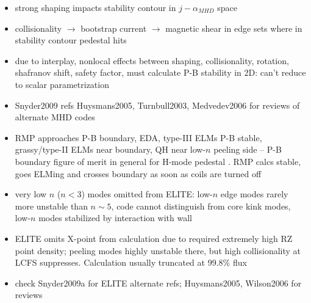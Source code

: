 \begin{itemize}
 \item strong shaping impacts stability contour in $j-\alpha_{MHD}$ space \cite{Snyder2009}
 \item collisionality $\rightarrow$ bootstrap current $\rightarrow$ magnetic shear in edge sets where in stability contour pedestal hits \cite{Snyder2009}
 \item due to interplay, nonlocal effects between shaping, collisionality, rotation, shafranov shift, safety factor, must calculate P-B stability in 2D: can't reduce to scalar parametrization \cite{Snyder2009}
 \item Snyder2009 refs Huysmans2005, Turnbull2003, Medvedev2006 \cite{Huysmans2005,Turnbull2003,Medvedev2006} for reviews of alternate MHD codes
 \item RMP approaches P-B boundary, EDA, type-III ELMs P-B stable, grassy/type-II ELMs near boundary, QH near low-$n$ peeling side -- P-B boundary figure of merit in general for H-mode pedestal \cite{Snyder2009}.  RMP calcs stable, goes ELMing and crosses boundary as soon as coils are turned off \cite{Snyder2009a}
 \item very low $n$ ($n < 3$) modes omitted from ELITE: low-$n$ edge modes rarely more unstable than $n \sim 5$, code cannot distinguish from core kink modes, low-$n$ modes stabilized by interaction with wall \cite{Snyder2009}
 \item ELITE omits X-point from calculation due to required extremely high RZ point density; peeling modes highly unstable there, but high collisionality at LCFS suppresses.  Calculation usually truncated at 99.8\% flux \cite{Snyder2009a}
 \item check Snyder2009a for ELITE alternate refs; Huysmans2005, Wilson2006 for reviews \cite{Snyder2009a,Huysmans2005,Wilson2006}
\end{itemize}

